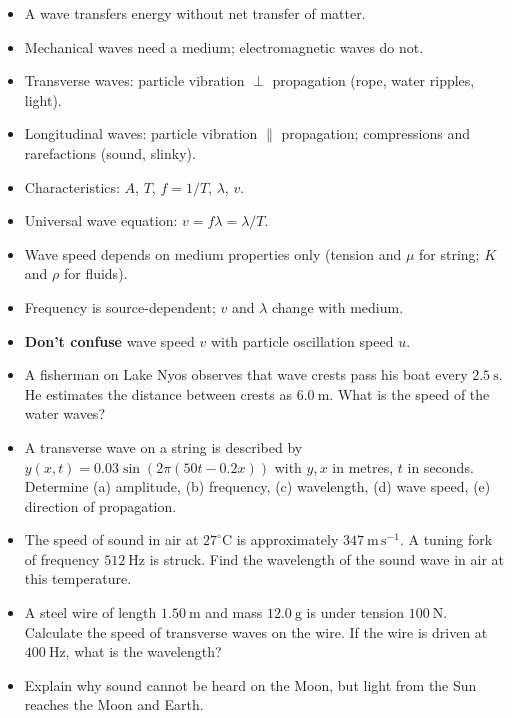 \documentclass[11pt]{article}
\newcounter{popsec}
\newcounter{popsub}
\newcommand{\courssub}[1]{%
  \stepcounter{popsub}%
  \par\vspace{9pt}\noindent{\popxbold\fontsize{11.5}{13}\selectfont\color{popink}{\color{poporange}\thepopsec.\thepopsub}\hspace{6pt}#1}\par\nopagebreak\vspace{4pt}
}
\begin{document}
\courssub{Key Points to Remember}

\begin{aretenir}
\begin{itemize}
\item A wave transfers energy without net transfer of matter.
\item Mechanical waves need a medium; electromagnetic waves do not.
\item Transverse waves: particle vibration $\perp$ propagation (rope, water ripples, light).
\item Longitudinal waves: particle vibration $\parallel$ propagation; compressions and rarefactions (sound, slinky).
\item Characteristics: $A$, $T$, $f=1/T$, $\lambda$, $v$.
\item Universal wave equation: $v = f\lambda = \lambda/T$.
\item Wave speed depends on medium properties only (tension and $\mu$ for string; $K$ and $\rho$ for fluids).
\item Frequency is source-dependent; $v$ and $\lambda$ change with medium.
\item \textbf{Don't confuse} wave speed $v$ with particle oscillation speed $u$.
\end{itemize}
\end{aretenir}

\begin{exercice}
\begin{itemize}
\item A fisherman on Lake Nyos observes that wave crests pass his boat every $2.5\ \mathrm{s}$. He estimates the distance between crests as $6.0\ \mathrm{m}$. What is the speed of the water waves?
\item A transverse wave on a string is described by $y(x,t) = 0.03\sin(2\pi(50t - 0.2x))$ with $y,x$ in metres, $t$ in seconds. Determine (a) amplitude, (b) frequency, (c) wavelength, (d) wave speed, (e) direction of propagation.
\item The speed of sound in air at $27^\circ\mathrm{C}$ is approximately $347\ \mathrm{m\,s^{-1}}$. A tuning fork of frequency $512\ \mathrm{Hz}$ is struck. Find the wavelength of the sound wave in air at this temperature.
\item A steel wire of length $1.50\ \mathrm{m}$ and mass $12.0\ \mathrm{g}$ is under tension $100\ \mathrm{N}$. Calculate the speed of transverse waves on the wire. If the wire is driven at $400\ \mathrm{Hz}$, what is the wavelength?
\item Explain why sound cannot be heard on the Moon, but light from the Sun reaches the Moon and Earth.
\end{itemize}
\end{exercice}
\end{document}
